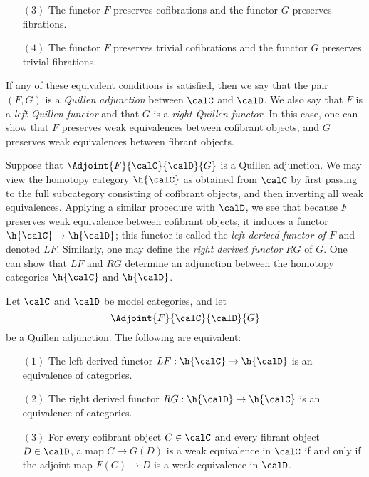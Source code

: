 \begin{Model Categories}
\begin{Already Read}
\begin{itemize}
\item[$(3)$] The functor $F$ preserves cofibrations and the functor $G$ preserves fibrations.

\item[$(4)$] The functor $F$ preserves trivial cofibrations and the functor $G$ preserves trivial fibrations.
\end{itemize}

If any of these equivalent conditions is satisfied, then we say that the pair $(F,G)$ is a {\it Quillen adjunction} between $\calC$ and $\calD$. We also say that $F$ is a {\it left Quillen functor} and that $G$ is a {\it right Quillen functor}. In this case, one can show that $F$ preserves weak equivalences between cofibrant objects, and $G$ preserves weak equivalences between fibrant objects.

Suppose that $\Adjoint{F}{\calC}{\calD}{G} $ is a Quillen adjunction.
We may view the homotopy category $\h{\calC}$ as obtained from $\calC$ by first passing to the full subcategory consisting of cofibrant objects, and then inverting all weak equivalences. Applying a similar procedure with $\calD$, we see that because $F$ preserves weak equivalence between cofibrant objects, it induces a functor $\h{\calC} \rightarrow \h{\calD}$; this functor is called the {\it left derived functor of $F$} and denoted $LF$. Similarly, one may define the {\it right derived functor} $RG$ of $G$. One can show that $LF$ and $RG$ determine an adjunction between the homotopy categories $\h{\calC}$ and $\h{\calD}$. 

\begin{proposition}\label{quilleq}
Let $\calC$ and $\calD$ be model categories, and let
$$ \Adjoint{F}{\calC}{\calD}{G} $$
be a Quillen adjunction. The following
are equivalent:
\begin{itemize}
\item[$(1)$] The left derived functor $LF: \h{\calC} \rightarrow \h{\calD}$ is an equivalence of categories.
\item[$(2)$] The right derived functor $RG: \h{\calD} \rightarrow \h{\calC}$ is an equivalence of categories.
\item[$(3)$] For every cofibrant object $C \in \calC$ and every fibrant object $D \in \calD$, a map
$C \rightarrow G(D)$ is a weak equivalence in $\calC$ if and only if the adjoint map $F(C) \rightarrow D$ is a weak equivalence in $\calD$.
\end{itemize}
\end{proposition}


\end{Already Read}
\end{Model Categories}
